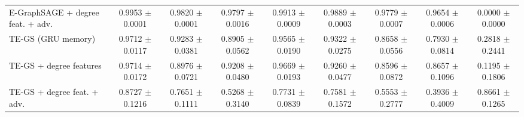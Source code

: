 \begin{table}[t]
\begin{tabular}{lcccccccc}
E-GraphSAGE + degree feat. + adv. & 0.9953 {\scriptsize $\pm$ 0.0001} & 0.9820 {\scriptsize $\pm$ 0.0001} & 0.9797 {\scriptsize $\pm$ 0.0016} & 0.9913 {\scriptsize $\pm$ 0.0009} & 0.9889 {\scriptsize $\pm$ 0.0003} & 0.9779 {\scriptsize $\pm$ 0.0007} & 0.9654 {\scriptsize $\pm$ 0.0006} & 0.0000 {\scriptsize $\pm$ 0.0000} \\
TE-GS (GRU memory) & 0.9712 {\scriptsize $\pm$ 0.0117} & 0.9283 {\scriptsize $\pm$ 0.0381} & 0.8905 {\scriptsize $\pm$ 0.0562} & 0.9565 {\scriptsize $\pm$ 0.0190} & 0.9322 {\scriptsize $\pm$ 0.0275} & 0.8658 {\scriptsize $\pm$ 0.0556} & 0.7930 {\scriptsize $\pm$ 0.0814} & 0.2818 {\scriptsize $\pm$ 0.2441} \\
TE-GS + degree features & 0.9714 {\scriptsize $\pm$ 0.0172} & 0.8976 {\scriptsize $\pm$ 0.0721} & 0.9208 {\scriptsize $\pm$ 0.0480} & 0.9669 {\scriptsize $\pm$ 0.0193} & 0.9260 {\scriptsize $\pm$ 0.0477} & 0.8596 {\scriptsize $\pm$ 0.0872} & 0.8657 {\scriptsize $\pm$ 0.1096} & 0.1195 {\scriptsize $\pm$ 0.1806} \\
TE-GS + degree feat. + adv. & 0.8727 {\scriptsize $\pm$ 0.1216} & 0.7651 {\scriptsize $\pm$ 0.1111} & 0.5268 {\scriptsize $\pm$ 0.3140} & 0.7731 {\scriptsize $\pm$ 0.0839} & 0.7581 {\scriptsize $\pm$ 0.1572} & 0.5553 {\scriptsize $\pm$ 0.2777} & 0.3936 {\scriptsize $\pm$ 0.4009} & 0.8661 {\scriptsize $\pm$ 0.1265} \\
\bottomrule
\end{tabular}
\end{table}